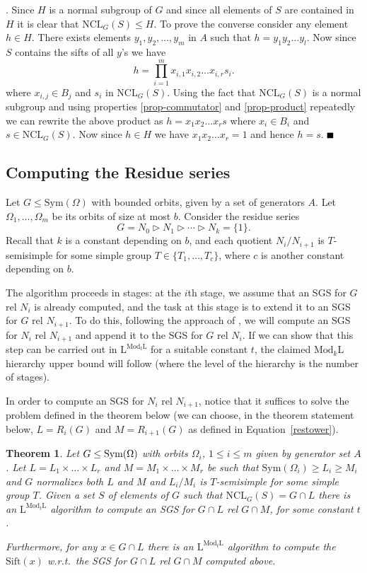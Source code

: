 \documentclass[11pt]{article}
\newtheorem{theorem}{Theorem}[section]
\newcommand{\bproof}{\noindent{\it Proof}}
\newcommand{\eproof}{\hspace*{\fill}$\rule{2mm}{2mm}$~~~~~\bigskip}
\renewenvironment{proof}{\bproof. }{\eproof}
\newcommand{\Mod}[1]{\ensuremath{\mathrm{Mod}_{#1}\mathrm{L}}}
\newcommand{\Lo}{\ensuremath{\mathrm{L}}}
\newcommand{\Sift}[1]{\ensuremath{\mathrm{Sift}({#1})}}
\newcommand{\NCL}[2]{\ensuremath{\mathrm{NCL}_{#1}({#2})}}
\newcommand{\sym}[1]{{\rm Sym(}#1{\bf )}}
\newcommand{\Sym}[1]{\ensuremath{\mathrm{Sym}\left({#1}\right)}}
\begin{document}
\begin{proof}
  Since $H$ is a normal subgroup of $G$ and since all elements of $S$
  are contained in $H$ it is clear that $\NCL{G}{S} \leq H$. To prove
  the converse consider any element $h \in H$. There exists elements
  $y_1,y_2,\ldots,y_m$ in $A$ such that $h = y_1y_2\ldots y_l$.  Now
  since $S$ contains the sifts of all $y$'s we have
  \[
  h = \prod_{i=1}^m x_{i,1}x_{i,2}\ldots x_{i,r} s_i.
  \]
  where $x_{i,j} \in B_j$ and $s_i$ in $\NCL{G}{S}$. Using the fact
  that $\NCL{G}{S}$ is a normal subgroup and using properties
  \ref{prop-commutator} and \ref{prop-product} repeatedly we can
  rewrite the above product as $h = x_1x_2\ldots x_r s$ where $x_i \in
  B_i$ and $s \in \NCL{G}{S}$. Now since $h \in H$ we have $x_1 x_2
  \ldots x_r =1$ and hence $h = s$.
\end{proof}

\subsection{Computing the Residue series}

Let $G\leq \Sym{\Omega}$ with bounded orbits, given by a set of
generators $A$. Let $\Omega_1,\ldots,\Omega_m$ be its orbits of size
at most $b$. Consider the residue series 
\[ 
G = N_0 \rhd N_1 \rhd \cdots \rhd N_k=\{1\}.
\] 
Recall that $k$ is a constant depending on $b$, and each quotient
$N_i/N_{i+1}$ is $T$-semisimple for some simple group
$T\in\{T_1,\ldots,T_c\}$, where $c$ is another constant depending on
$b$.

The algorithm proceeds in stages: at the $i$th stage, we assume that
an SGS for $G$ rel $N_i$ is already computed, and the task at this
stage is to extend it to an SGS for $G$ rel $N_{i+1}$. To do this,
following the approach of \cite{LM}, we will compute an SGS for $N_i$
rel $N_{i+1}$ and append it to the SGS for $G$ rel $N_{i}$. If we can
show that this step can be carried out in $\Lo^{\Mod{t}}$ for a
suitable constant $t$, the claimed $\Mod{k}$ hierarchy upper bound
will follow (where the level of the hierarchy is the number of
stages).

In order to compute an SGS for $N_i$ rel $N_{i+1}$, notice that it
 suffices to solve the problem defined in the theorem below (we can
 choose, in the theorem statement below, $L=R_i(G)$ and $M=R_{i+1}(G)$
 as defined in Equation~\ref{restower}).

\begin{theorem}\label{thm-normal-closure}
  Let $G\leq\sym{\Omega}$ with orbits $\Omega_i$, $1 \leq i \leq m$
  given by generator set $A$. Let $L = L_1 \times \ldots \times L_r$
  and $M = M_1 \times \ldots \times M_r$ be such that $\Sym{\Omega_i}
  \geq L_i \geq M_i$ and $G$ normalizes both $L$ and $M$ and $L_i/M_i$
  is $T$-semisimple for some simple group $T$. Given a set $S$
  of elements of $G$ such that $\NCL{G}{S} = G \cap L$ there is an
  $\Lo^{\Mod{t}}$ algorithm to compute an SGS for $G \cap L$ rel $G \cap
  M$, for some constant $t$.

Furthermore, for any $x\in G\cap L$ there is an $\Lo^{\Mod{t}}$
algorithm to compute the $\Sift{x}$ w.r.t.\ the SGS for $G \cap L$ rel
$G \cap M$ computed above.
\end{theorem}
\end{document}
